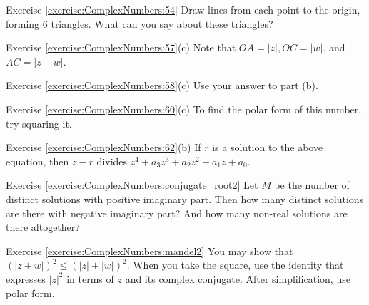 \noindent Exercise \ref{exercise:ComplexNumbers:54}
Draw lines from each point to the origin, forming 6 triangles. What can you say about these triangles?

\noindent Exercise \ref{exercise:ComplexNumbers:57}(c)
Note that $OA = |z|, OC = |w|.$ and $AC = |z-w|$.

\noindent Exercise \ref{exercise:ComplexNumbers:58}(c)
Use your answer to part (b).

\noindent Exercise \ref{exercise:ComplexNumbers:60}(c)
 To find the polar form of this number, try squaring it.

\noindent Exercise \ref{exercise:ComplexNumbers:62}(b)
If $r$ is a solution to the above equation, then $z-r$ divides  $z^4 + a_{3}z^{3} + a_{2} z^{2}+ a_1 z  + a_0$.

\noindent Exercise \ref{exercise:ComplexNumbers:conjugate_root2}
 Let $M$ be the number of distinct solutions with positive imaginary part. Then how many distinct solutions are there with negative imaginary part? And how many non-real solutions are there altogether?

\noindent Exercise \ref{exercise:ComplexNumbers:mandel2}
 You may show that $(|z+w|)^2 \le (|z| + |w|)^2$.  When you take the square, use the identity that expresses $|z|^2$ in terms of $z$ and its complex conjugate.  After simplification, use polar form.  